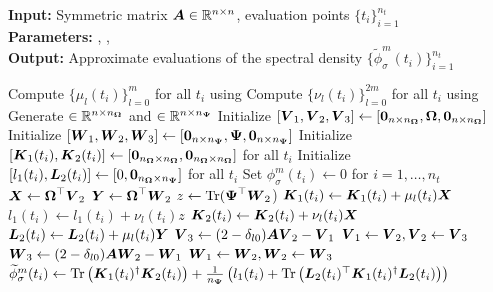 \hspace*{\algorithmicindent} \textbf{Input:} Symmetric matrix $\boldsymbol{A} \in \mathbb{R}^{n \times n}$, evaluation points $\{t_i\}_{i=1}^{n_t}$ \\
\hspace*{\algorithmicindent} \textbf{Parameters:} , ,  \\
\hspace*{\algorithmicindent} \textbf{Output:} Approximate evaluations of the spectral density $\{\widetilde{\phi}_{\sigma}^m(t_i)\}_{i=1}^{n_t}$
\begin{algorithmic}[1]
    \State Compute $\{\mu_l(t_i)\}_{l=0}^m$ for all $t_i$ using 
    \State Compute $\{\nu_l(t_i)\}_{l=0}^{2m}$ for all $t_i$ using 
    \State Generate  $\in \mathbb{R}^{n \times n_{\boldsymbol{\Omega}}}$ and  $\in \mathbb{R}^{n \times n_{\boldsymbol{\Psi}}}$
    \State Initialize $[\boldsymbol{V}_1, \boldsymbol{V}_2, \boldsymbol{V}_3] \gets [\boldsymbol{0}_{n \times n_{\boldsymbol{\Omega}}}, \boldsymbol{\boldsymbol{\Omega}}, \boldsymbol{0}_{n \times n_{\boldsymbol{\Omega}}}]$
    \State Initialize $[\boldsymbol{W}_1, \boldsymbol{W}_2, \boldsymbol{W}_3] \gets [\boldsymbol{0}_{n \times n_{\boldsymbol{\Psi}}}, \boldsymbol{\Psi}, \boldsymbol{0}_{n \times n_{\boldsymbol{\Psi}}}]$
    \State Initialize $[\boldsymbol{K}_1(t_i), \boldsymbol{K}_2(t_i)] \gets [\boldsymbol{0}_{n_{\boldsymbol{\Omega}} \times n_{\boldsymbol{\Omega}}}, \boldsymbol{0}_{n_{\boldsymbol{\Omega}} \times n_{\boldsymbol{\Omega}}}]$ for all $t_i$
    \State Initialize $[l_1(t_i), \boldsymbol{L}_2(t_i)] \gets [0, \boldsymbol{0}_{n_{\boldsymbol{\Omega}} \times n_{\boldsymbol{\Psi}}}]$ for all $t_i$
    \State Set ${\phi}_{\sigma}^m(t_i) \gets 0$ for $i=1,\dots,n_t$
      \State $\boldsymbol{X} \gets \boldsymbol{\boldsymbol{\Omega}}^{\top} \boldsymbol{V}_2$
      \State $\boldsymbol{Y} \gets \boldsymbol{\boldsymbol{\Omega}}^{\top} \boldsymbol{W}_2$
      \State $z \gets \operatorname{Tr}(\boldsymbol{\Psi}^{\top} \boldsymbol{W}_2$)
            \State $\boldsymbol{K}_1(t_i) \gets \boldsymbol{K}_1(t_i) + \mu_l(t_i) \boldsymbol{X}$
            \State $l_1(t_i) \gets l_1(t_i) + \nu_l(t_i) z$
        \EndIf
        \State $\boldsymbol{K}_2(t_i) \gets \boldsymbol{K}_2(t_i) + \nu_l(t_i) \boldsymbol{X}$
        \State $\boldsymbol{L}_2(t_i) \gets \boldsymbol{L}_2(t_i) + \mu_l(t_i) \boldsymbol{Y}$
      \EndFor
      \State $\boldsymbol{V}_3 \gets (2 - \delta_{l0}) \boldsymbol{A} \boldsymbol{V}_2 - \boldsymbol{V}_1$ 
      \State $\boldsymbol{V}_1 \gets \boldsymbol{V}_2, \boldsymbol{V}_2 \gets \boldsymbol{V}_3$
      \State $\boldsymbol{W}_3 \gets (2 - \delta_{l0}) \boldsymbol{A} \boldsymbol{W}_2 - \boldsymbol{W}_1$ 
      \State $\boldsymbol{W}_1 \gets \boldsymbol{W}_2, \boldsymbol{W}_2 \gets \boldsymbol{W}_3$
    \EndFor
      \State $\widetilde{\phi}_{\sigma}^m(t_i) \gets \operatorname{Tr}\left( \boldsymbol{K}_1(t_i)^{\dagger}\boldsymbol{K}_2(t_i) \right) + \frac{1}{n_{\boldsymbol{\Psi}}} \left( l_1(t_i) + \operatorname{Tr}\left( \boldsymbol{L}_2(t_i)^{\top} \boldsymbol{K}_1(t_i)^{\dagger} \boldsymbol{L}_2(t_i) \right)  \right) $
    \EndFor
\end{algorithmic}
